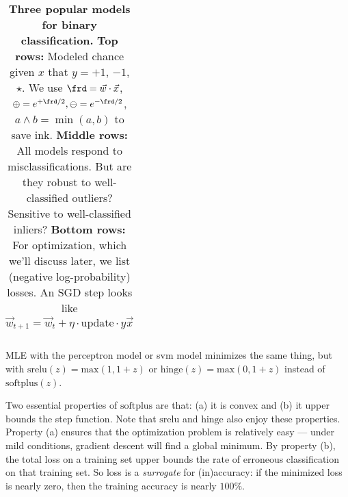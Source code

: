 \begin{table}
\begin{tabular}{RCCCC}
    \end{tabular}
    \caption{%
      \textbf{Three popular models for binary classification.}
      \textbf{Top rows:} Modeled chance given $x$ that $y=+1$, $-1$,
      $\star$.  We use $\frd = \vec w\cdot \vec x$,
      $\oplus=e^{+\frd/2}, \ominus = e^{-\frd/2}$,
      $a\wedge b = \min(a,b)$ to save ink.
      \textbf{Middle rows:} All models respond to misclassifications.
      But are they robust
      to well-classified outliers?
      Sensitive to well-classified inliers?
      \textbf{Bottom rows:} For optimization, which we'll
      discuss later, we list (negative log-probability) losses.
      An SGD step looks like
      $$
        \vec w_{t+1} = \vec w_t + \eta \cdot \text{update} \cdot y \vec x
      $$
    }
    \vspace{+0.3cm}
  \end{table}

  MLE with the perceptron model or svm model minimizes
  the same thing, but with
  $\text{srelu}(z) = \text{max}(1,1+z)$ or
  $\text{hinge}(z) = \text{max}(0,1+z)$
  instead of $\text{softplus}(z)$.

  Two essential properties of $\text{softplus}$ are that:
  (a) it is convex
  and
  (b) it upper bounds the step function.
  Note that $\text{srelu}$ and $\text{hinge}$ also enjoy
  these properties.  Property (a) ensures that the optimization problem
  is relatively easy --- under mild conditions, gradient descent will
  find a global minimum.  By property (b), the total loss
  on a training set upper bounds the rate of erroneous classification on
  that training set.  So loss is a \emph{surrogate} for (in)accuracy: if
  the minimized loss is nearly zero, then the training accuracy is nearly
  $100\%$.

